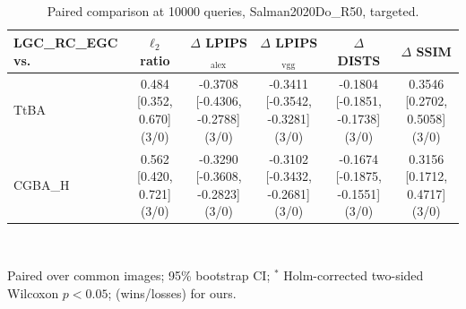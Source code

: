 \begin{table}[t]
\centering\footnotesize
\caption{Paired comparison at 10000 queries, Salman2020Do\_R50, targeted.}
\begin{tabular}{lccccc}
\toprule
LGC\_RC\_EGC vs. & $\ell_2$ ratio & $\Delta$ LPIPS$_{\mathrm{alex}}$ & $\Delta$ LPIPS$_{\mathrm{vgg}}$ & $\Delta$ DISTS & $\Delta$ SSIM \\
\midrule
TtBA & 0.484 [0.352, 0.670] (3/0) & -0.3708 [-0.4306, -0.2788] (3/0) & -0.3411 [-0.3542, -0.3281] (3/0) & -0.1804 [-0.1851, -0.1738] (3/0) & 0.3546 [0.2702, 0.5058] (3/0) \\
CGBA\_H & 0.562 [0.420, 0.721] (3/0) & -0.3290 [-0.3608, -0.2823] (3/0) & -0.3102 [-0.3432, -0.2681] (3/0) & -0.1674 [-0.1875, -0.1551] (3/0) & 0.3156 [0.1712, 0.4717] (3/0) \\
\bottomrule
\end{tabular}
\\[2pt]\parbox{\linewidth}{\scriptsize Paired over common images; 95\% bootstrap CI; $^{*}$ Holm-corrected two-sided Wilcoxon $p<0.05$; (wins/losses) for ours.}
\end{table}
